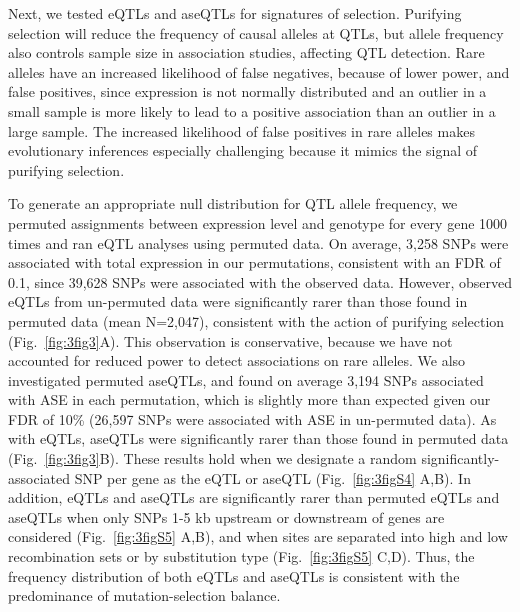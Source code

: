 Next, we tested eQTLs and aseQTLs for signatures of selection. Purifying selection will reduce the frequency of causal alleles at QTLs, but allele frequency also controls sample size in association studies, affecting QTL detection. Rare alleles have an increased likelihood of false negatives, because of lower power, and false positives, since expression is not normally distributed and an outlier in a small sample is more likely to lead to a positive association than an outlier in a large sample. The increased likelihood of false positives in rare alleles makes evolutionary inferences especially challenging because it mimics the signal of purifying selection.

To generate an appropriate null distribution for QTL allele frequency, we permuted assignments between expression level and genotype for every gene 1000 times and ran eQTL analyses using permuted data. On average, 3,258 SNPs were associated with total expression in our permutations, consistent with an FDR of 0.1, since 39,628 SNPs were associated with the observed data. However, observed eQTLs from un-permuted data were significantly rarer than those found in permuted data (mean N=2,047), consistent with the action of purifying selection (Fig.~\ref{fig:3fig3}A). This observation is conservative, because we have not accounted for reduced power to detect associations on rare alleles. We also investigated permuted aseQTLs, and found on average 3,194 SNPs associated with ASE in each permutation, which is slightly more than expected given our FDR of 10\% (26,597 SNPs were associated with ASE in un-permuted data). As with eQTLs, aseQTLs were significantly rarer than those found in permuted data (Fig.~\ref{fig:3fig3}B). These results hold when we designate a random significantly-associated SNP per gene as the eQTL or aseQTL (Fig.~\ref{fig:3figS4} A,B). In addition, eQTLs and aseQTLs are significantly rarer than permuted eQTLs and aseQTLs when only SNPs 1-5 kb upstream or downstream of genes are considered (Fig.~\ref{fig:3figS5} A,B), and when sites are separated into high and low recombination sets or by substitution type (Fig.~\ref{fig:3figS5} C,D). Thus, the frequency distribution of both eQTLs and aseQTLs is consistent with the predominance of mutation-selection balance.

